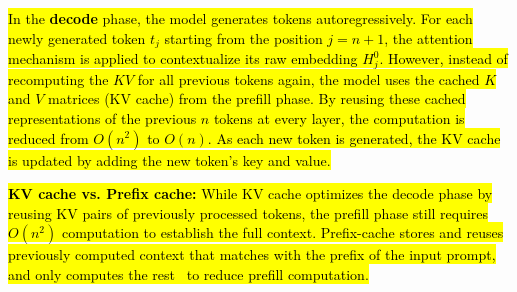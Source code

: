 \hl{In the \textbf{decode} phase, the model generates tokens autoregressively. 
For each newly generated token $t_j$ starting from the position $j=n+1$, the attention mechanism is applied to contextualize its raw embedding $H^0_j$.
However, instead of recomputing the $KV$ for all previous tokens again, the model uses the cached $K$ and $V$ matrices (KV cache) from the prefill phase. By reusing these cached representations of the previous $n$ tokens at every layer, the computation is reduced from $O(n^2)$ to $O(n)$. As each new token is generated, the KV cache is updated by adding the new token's key and value.}

\hl{\textbf{KV cache vs. Prefix cache:} While KV cache optimizes the decode phase by reusing KV pairs of previously processed tokens, the prefill phase still requires $O(n^2)$ computation to establish the full context. Prefix-cache stores and reuses previously computed context that matches with the prefix of the input prompt, and only computes the rest~\cite{zheng2023efficiently} to reduce prefill computation. 
}


